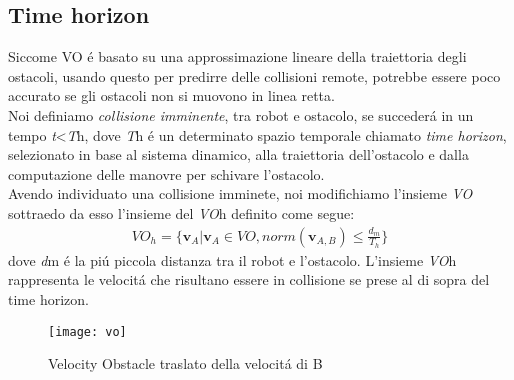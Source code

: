 \subsection{Time horizon}
Siccome VO \'e basato su una approssimazione lineare della traiettoria degli ostacoli, usando questo per predirre delle collisioni remote, potrebbe essere poco accurato se gli ostacoli non si muovono in linea retta. \\Noi definiamo \textit{collisione imminente}, tra robot e ostacolo, se succeder\'a in un tempo \textit{t}<\textit{T}\ped h, dove \textit{T}\ped h \'e un determinato spazio temporale chiamato \textit{time horizon}, selezionato in base al sistema dinamico, alla traiettoria dell'ostacolo e dalla computazione delle manovre per schivare l'ostacolo.
\\Avendo individuato una collisione imminete, noi modifichiamo l'insieme \textit{VO} sottraedo da esso l'insieme del \textit{VO}\ped h definito come segue:
\begin{gather}
VO_h=  \{ \boldsymbol{v}_{A} | \boldsymbol{v}_{A} \in VO, norm( \boldsymbol{v}_{A,B})\leq \tfrac{d_m}{T_h} \}
\end{gather}
dove \textit{d}\ped m \'e la pi\'u piccola distanza tra il robot e l'ostacolo. L'insieme \textit{VO}\ped h rappresenta le velocit\'a che risultano essere in collisione se prese al di sopra del time horizon.
\begin{figure}
\centering 
\texttt{[image: vo]} 
\caption[Velocity Obstacle traslato della velocit\'a di B]{Velocity Obstacle traslato della velocit\'a di B}
\label{fig:vo} 
\end{figure}

